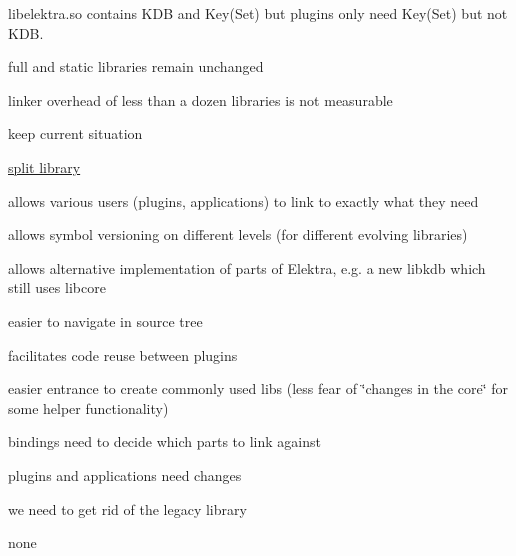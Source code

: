 libelektra.\+so contains K\+DB and Key(\+Set) but plugins only need Key(\+Set) but not K\+DB.


\begin{DoxyItemize}
\item full and static libraries remain unchanged
\end{DoxyItemize}


\begin{DoxyItemize}
\item linker overhead of less than a dozen libraries is not measurable
\end{DoxyItemize}


\begin{DoxyItemize}
\item keep current situation
\end{DoxyItemize}


\begin{DoxyItemize}
\item \hyperlink{src_libs_README_md}{split library}
\end{DoxyItemize}


\begin{DoxyItemize}
\item allows various users (plugins, applications) to link to exactly what they need
\item allows symbol versioning on different levels (for different evolving libraries)
\item allows alternative implementation of parts of Elektra, e.\+g. a new libkdb which still uses libcore
\item easier to navigate in source tree
\item facilitates code reuse between plugins
\item easier entrance to create commonly used libs (less fear of \char`\"{}changes in the core\char`\"{} for some helper functionality)
\end{DoxyItemize}


\begin{DoxyItemize}
\item bindings need to decide which parts to link against
\item plugins and applications need changes
\item we need to get rid of the legacy library
\end{DoxyItemize}


\begin{DoxyItemize}
\item none
\end{DoxyItemize}


